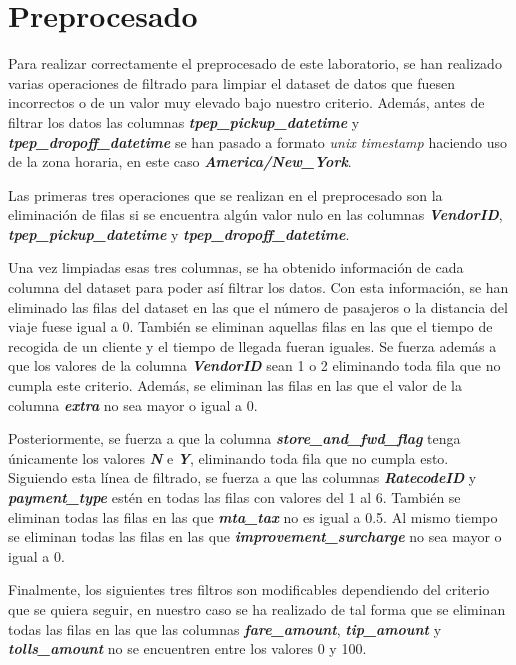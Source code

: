 \section{Preprocesado}

Para realizar correctamente el preprocesado de este laboratorio, se han realizado varias operaciones de filtrado para limpiar el dataset de datos que fuesen incorrectos o de un valor muy elevado bajo nuestro criterio. Además, antes de filtrar los datos las columnas \textbf{\textit{tpep\_pickup\_datetime}} y \textbf{\textit{tpep\_dropoff\_datetime}} se han pasado a formato \textit{unix timestamp} haciendo uso de la zona horaria, en este caso \textbf{\textit{America/New\_York}}.

Las primeras tres operaciones que se realizan en el preprocesado son la eliminación de filas si se encuentra algún valor nulo en las columnas \textbf{\textit{VendorID}}, \textbf{\textit{tpep\_pickup\_datetime}} y \textbf{\textit{tpep\_dropoff\_datetime}}.

Una vez limpiadas esas tres columnas, se ha obtenido información de cada columna del dataset para poder así filtrar los datos. Con esta información, se han eliminado las filas del dataset en las que el número de pasajeros o la distancia del viaje fuese igual a 0. También se eliminan aquellas filas en las que el tiempo de recogida de un cliente y el tiempo de llegada fueran iguales. Se fuerza además a que los valores de la columna \textbf{\textit{VendorID}} sean 1 o 2 eliminando toda fila que no cumpla este criterio. Además, se eliminan las filas en las que el valor de la columna \textbf{\textit{extra}} no sea mayor o igual a 0.

Posteriormente, se fuerza a que la columna \textbf{\textit{store\_and\_fwd\_flag}} tenga únicamente los valores \textbf{\textit{N}} e \textbf{\textit{Y}}, eliminando toda fila que no cumpla esto. Siguiendo esta línea de filtrado, se fuerza a que las columnas \textbf{\textit{RatecodeID}} y \textbf{\textit{payment\_type}} estén en todas las filas con valores del 1 al 6. También se eliminan todas las filas en las que \textbf{\textit{mta\_tax}} no es igual a 0.5. Al mismo tiempo se eliminan todas las filas en las que \textbf{\textit{improvement\_surcharge}} no sea mayor o igual a 0.

Finalmente, los siguientes tres filtros son modificables dependiendo del criterio que se quiera seguir, en nuestro caso se ha realizado de tal forma que se eliminan todas las filas en las que las columnas \textbf{\textit{fare\_amount}}, \textbf{\textit{tip\_amount}} y \textbf{\textit{tolls\_amount}} no se encuentren entre los valores 0 y 100.
